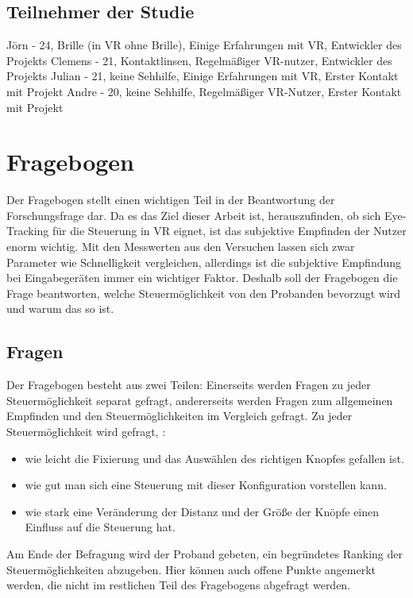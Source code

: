 \subsection{Teilnehmer der Studie}
Jörn - 24, Brille (in VR ohne Brille), Einige Erfahrungen mit VR, Entwickler des Projekts
Clemens - 21, Kontaktlinsen, Regelmäßiger VR-nutzer, Entwickler des Projekts
Julian - 21, keine Sehhilfe, Einige Erfahrungen mit VR, Erster Kontakt mit Projekt
Andre - 20, keine Sehhilfe, Regelmäßiger VR-Nutzer, Erster Kontakt mit Projekt

\section{Fragebogen} 
\label{section:fragebogen}
Der Fragebogen stellt einen wichtigen Teil in der Beantwortung der Forschungsfrage dar. Da es das Ziel dieser Arbeit ist, herauszufinden, ob sich Eye-Tracking für die Steuerung in VR eignet, ist das subjektive Empfinden der Nutzer enorm wichtig. Mit den Messwerten aus den Versuchen lassen sich zwar Parameter wie Schnelligkeit vergleichen, allerdings ist die subjektive Empfindung bei Eingabegeräten immer ein wichtiger Faktor. Deshalb soll der Fragebogen die Frage beantworten, welche Steuermöglichkeit von den Probanden bevorzugt wird und warum das so ist.
\subsection{Fragen}
Der Fragebogen besteht aus zwei Teilen: Einerseits werden Fragen zu jeder Steuermöglichkeit separat gefragt, andererseits werden Fragen zum allgemeinen Empfinden und den Steuermöglichkeiten im Vergleich gefragt.
Zu jeder Steuermöglichkeit wird gefragt, :
\begin{itemize}
	\item wie leicht die Fixierung und das Auswählen des richtigen Knopfes gefallen ist.
	\item wie gut man sich eine Steuerung mit dieser Konfiguration vorstellen kann.
	\item wie stark eine Veränderung der Distanz und der Größe der Knöpfe einen Einfluss auf die Steuerung hat.
\end{itemize}
Am Ende der Befragung wird der Proband gebeten, ein begründetes Ranking der Steuermöglichkeiten abzugeben. Hier können auch offene Punkte angemerkt werden, die nicht im restlichen Teil des Fragebogens abgefragt werden.


